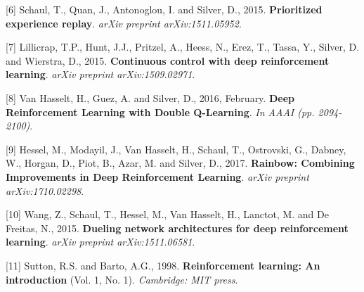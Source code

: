 \documentclass{article}
\begin{document}
[6] Schaul, T., Quan, J., Antonoglou, I. and Silver, D., 2015. {\bf Prioritized experience replay}. {\it arXiv preprint arXiv:1511.05952}.

[7] Lillicrap, T.P., Hunt, J.J., Pritzel, A., Heess, N., Erez, T., Tassa, Y., Silver, D. and Wierstra, D., 2015. {\bf Continuous control with deep reinforcement learning}. {\it arXiv preprint arXiv:1509.02971}.

[8] Van Hasselt, H., Guez, A. and Silver, D., 2016, February. {\bf Deep Reinforcement Learning with Double Q-Learning}. {\it In AAAI (pp. 2094-2100)}.

[9] Hessel, M., Modayil, J., Van Hasselt, H., Schaul, T., Ostrovski, G., Dabney, W., Horgan, D., Piot, B., Azar, M. and Silver, D., 2017. {\bf Rainbow: Combining Improvements in Deep Reinforcement Learning}. {\it arXiv preprint arXiv:1710.02298}.

[10] Wang, Z., Schaul, T., Hessel, M., Van Hasselt, H., Lanctot, M. and De Freitas, N., 2015. {\bf Dueling network architectures for deep reinforcement learning}. {\it arXiv preprint arXiv:1511.06581}.

[11] Sutton, R.S. and Barto, A.G., 1998. {\bf Reinforcement learning: An introduction} (Vol. 1, No. 1). {\it Cambridge: MIT press}.
\end{document}
